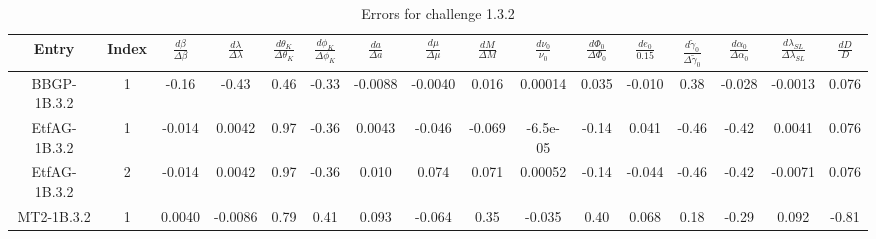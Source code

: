 \documentclass[prd,aps,amsfonts,amsmath, nofootinbib]{revtex4}
\begin{document}
\begin{table}
\caption{\label{EMRI_err} Errors for challenge 1.3.2}
\begin{ruledtabular}
\begin{tabular}{|c|c|c|c|c|c|c|c|c|c|c|c|c|c|c|c|}
Entry & Index & $\frac{d\beta}{\Delta\beta}$ & 
$\frac{d\lambda}{\Delta\lambda}$ &
 $\frac{d\theta_K}{\Delta\theta_K}$ & $\frac{d\phi_K}{\Delta\phi_K}$ 
 & $\frac{da}{\Delta a}$ & $\frac{d\mu}{\Delta\mu}$ & 
 $\frac{dM}{\Delta M}$ &  $\frac{d\nu_0}{\nu_0}$ & 
 $\frac{d\Phi_0}{\Delta\Phi_0}$ &  $\frac{de_0}{0.15}$ & 
 $\frac{d\tilde{\gamma}_0}{\Delta\tilde{\gamma}_0}$ &
 $\frac{d\alpha_0}{\Delta\alpha_0}$ & 
 $\frac{d\lambda_{SL}}{\Delta\lambda_{SL}}$ &
  $\frac{dD}{D}$ \\ 
\hline
BBGP-1B.3.2 & 1 &  -0.16   &   -0.43   &   0.46   &   -0.33   &   -0.0088   &   -0.0040   &   0.016   &   0.00014   &   0.035   &   -0.010   &   0.38   &   -0.028   &   -0.0013   &   0.076\\
EtfAG-1B.3.2 & 1 &  -0.014   &   0.0042   &   0.97   &   -0.36   &   0.0043   &   -0.046   &   -0.069   &   -6.5e-05   &   -0.14   &   0.041   &   -0.46   &   -0.42   &   0.0041   &   0.076\\
EtfAG-1B.3.2 & 2 &  -0.014   &   0.0042   &   0.97   &   -0.36   &   0.010   &   0.074   &   0.071   &   0.00052   &   -0.14   &   -0.044   &   -0.46   &   -0.42   &   -0.0071   &   0.076\\
MT2-1B.3.2 & 1 & 0.0040   &   -0.0086   &   0.79   &   0.41   &   0.093   &   -0.064   &   0.35   &   -0.035   &   0.40   &   0.068   &   0.18   &   -0.29   &   0.092   &   -0.81 \\
\hline
\end{tabular}
\end{ruledtabular}
\end{table}
\end{document}
